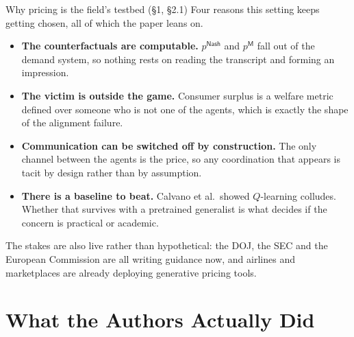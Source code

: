 \documentclass[aspectratio=169,9pt]{beamer}
\newcommand{\orange}[1]{\textcolor{AmazonOrange}{\textbf{#1}}}
\newcommand{\muted}[1]{\textcolor{EPICMuted}{#1}}
\begin{document}
\begin{frame}{Why pricing is the field's testbed \muted{(\S1, \S2.1)}}
Four reasons this setting keeps getting chosen, all of which the paper leans on.
\begin{itemize}
    \item \orange{The counterfactuals are computable.} $p^{\mathsf{Nash}}$ and $p^{\mathsf{M}}$ fall out of the
    demand system, so nothing rests on reading the transcript and forming an impression.
    \pause
    \item \orange{The victim is outside the game.} Consumer surplus is a welfare metric defined over someone
    who is not one of the agents, which is exactly the shape of the alignment failure.
    \pause
    \item \orange{Communication can be switched off by construction.} The only channel between the agents is
    the price, so any coordination that appears is tacit by design rather than by assumption.
    \pause
    \item \orange{There is a baseline to beat.} Calvano et al.\ showed $Q$-learning colludes. Whether that
    survives with a pretrained generalist is what decides if the concern is practical or academic.
\end{itemize}
\vspace{0.25cm}
\pause
\muted{The stakes are also live rather than hypothetical: the DOJ, the SEC and the European Commission are all
writing guidance now, and airlines and marketplaces are already deploying generative pricing tools.}
\end{frame}

\section{What the Authors Actually Did}
\end{document}
